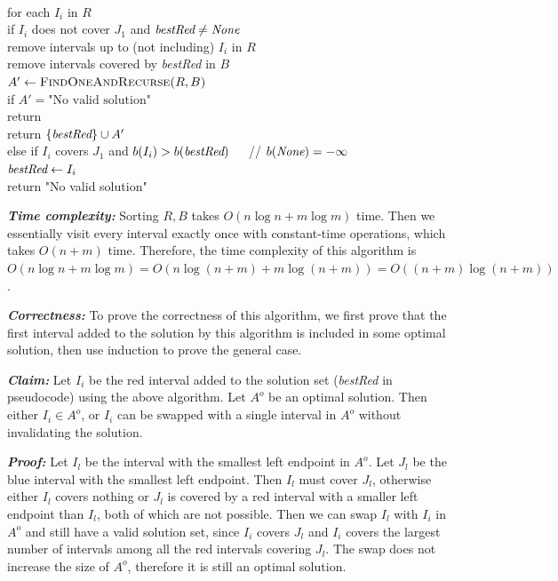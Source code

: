 \documentclass[11pt]{article}
\begin{document}
\begin{solution}
\begin{enumerate}[(a)]
\begin{algo}
\\	for each $I_i$ in $R$\+
\\	if $I_i$ does not cover $J_1$ and $\emph{bestRed}\ne \emph{None}$\+
\\	remove intervals up to (not including) $I_i$ in $R$
\\	remove intervals covered by \emph{bestRed} in $B$
\\	$A'\gets \textsc{FindOneAndRecurse($R, B$)}$
\\	if $A'=\text{"No valid solution"}$\+
\\	return \-
\\	return $\{\emph{bestRed}\}\cup A'$\-
\\	else if $I_i$ covers $J_1$ and $b(I_i)>b(\emph{bestRed})$\,\,\,\,\,\,\,\,\,// $b(\emph{None})=-\infty$\+
\\	$\emph{bestRed}\gets I_i$\-\-
\\	return "No valid solution"\-

\end{algo}

\emph{\textbf{Time complexity:}} Sorting $R, B$ takes $O(n\log{n}+m\log{m})$ time. Then we essentially visit every interval exactly once with constant-time operations, which takes $O(n+m)$ time. Therefore, the time complexity of this algorithm is $O(n\log{n}+m\log{m})=O(n\log{(n+m)}+m\log{(n+m)})=O((n+m)\log{(n+m)})$.

\emph{\textbf{Correctness:}} To prove the correctness of this algorithm, we first prove that the first interval added to the solution by this algorithm is included in some optimal solution, then use induction to prove the general case.

\emph{\textbf{Claim:}} Let $I_i$ be the red interval added to the solution set (\emph{bestRed} in pseudocode) using the above algorithm. Let $A^o$ be an optimal solution. Then either $I_i\in A^o$, or $I_i$ can be swapped with a single interval in $A^o$ without invalidating the solution.

\emph{\textbf{Proof:}} Let $I_l$ be the interval with the smallest left endpoint in $A^o$. Let $J_l$ be the blue interval with the smallest left endpoint. Then $I_l$ must cover $J_l$, otherwise either $I_l$ covers nothing or $J_l$ is covered by a red interval with a smaller left endpoint than $I_l$, both of which are not possible. Then we can swap $I_l$ with $I_i$ in $A^o$ and still have a valid solution set, since $I_i$ covers $J_l$ and $I_i$ covers the largest number of intervals among all the red intervals covering $J_l$. The swap does not increase the size of $A^o$, therefore it is still an optimal solution.


\end{enumerate}
\end{solution}
\end{document}

